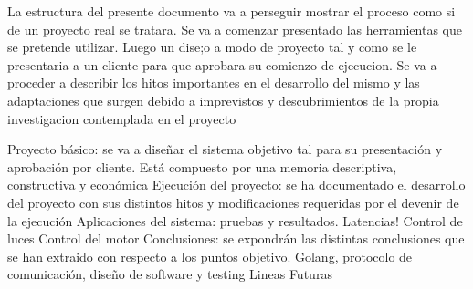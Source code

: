 La estructura del presente documento va a perseguir mostrar el proceso como si de un proyecto real se tratara. Se va a comenzar presentado las herramientas que se pretende utilizar. Luego un dise;o a modo de proyecto tal y como se le presentaria a un cliente para que aprobara su comienzo de ejecucion. Se va a proceder a describir los hitos importantes en el desarrollo del mismo y las adaptaciones que surgen debido a imprevistos y descubrimientos de la propia investigacion contemplada en el proyecto

Proyecto básico: se va a diseñar el sistema objetivo tal para su presentación y aprobación por cliente. Está compuesto por una memoria descriptiva, constructiva y económica
Ejecución del proyecto: se ha documentado el desarrollo del proyecto con sus distintos hitos y modificaciones requeridas por el devenir de la ejecución
Aplicaciones del sistema: pruebas y resultados. 
Latencias!
Control de luces
Control del motor
Conclusiones: se expondrán las distintas conclusiones que se han extraido con respecto a los puntos objetivo. Golang, protocolo de comunicación, diseño de software y testing
Lineas Futuras
